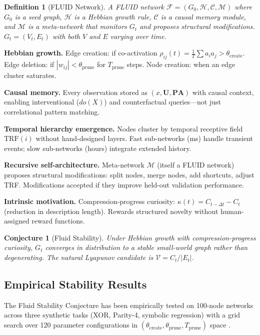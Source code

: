 \documentclass[12pt]{article}
\newtheorem{definition}{Definition}
\newtheorem{conjecture}{Conjecture}
\begin{document}
\begin{definition}[FLUID Network]
A FLUID network $\mathcal{F} = (G_0, \mathcal{H}, \mathcal{C}, \mathcal{M})$ where $G_0$ is a seed graph, $\mathcal{H}$ is a Hebbian growth rule, $\mathcal{C}$ is a causal memory module, and $\mathcal{M}$ is a meta-network that monitors $G_t$ and proposes structural modifications. $G_t = (V_t, E_t)$ with both $V$ and $E$ varying over time.
\end{definition}

\textbf{Hebbian growth.} Edge creation: if co-activation $\rho_{ij}(t) = \frac{1}{T}\sum a_i a_j > \theta_{\text{create}}$. Edge deletion: if $|w_{ij}| < \theta_{\text{prune}}$ for $T_{\text{prune}}$ steps. Node creation: when an edge cluster saturates.

\textbf{Causal memory.} Every observation stored as $(x, \mathbf{U}, \mathbf{PA})$ with causal context, enabling interventional ($do(X)$) and counterfactual queries---not just correlational pattern matching.

\textbf{Temporal hierarchy emergence.} Nodes cluster by temporal receptive field $\text{TRF}(i)$ without hand-designed layers. Fast sub-networks (ms) handle transient events; slow sub-networks (hours) integrate extended history.

\textbf{Recursive self-architecture.} Meta-network $\mathcal{M}$ (itself a FLUID network) proposes structural modifications: split nodes, merge nodes, add shortcuts, adjust TRF. Modifications accepted if they improve held-out validation performance.

\textbf{Intrinsic motivation.} Compression-progress curiosity: $\kappa(t) = C_{t-\Delta t} - C_t$ (reduction in description length). Rewards structured novelty without human-assigned reward functions.

\begin{conjecture}[Fluid Stability]
Under Hebbian growth with compression-progress curiosity, $G_t$ converges in distribution to a stable small-world graph rather than degenerating. The natural Lyapunov candidate is $\mathcal{V} = C_t / |E_t|$.
\end{conjecture}

\subsection{Empirical Stability Results}

The Fluid Stability Conjecture has been empirically tested on 100-node networks across three synthetic tasks (XOR, Parity-4, symbolic regression) with a grid search over 120 parameter configurations in $(\theta_{\text{create}}, \theta_{\text{prune}}, T_{\text{prune}})$ space \cite{lin2026fluid_empirical}.
\end{document}
